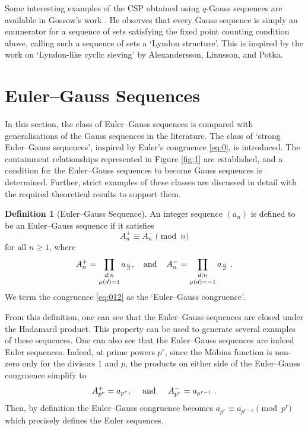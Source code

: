 \documentclass{article}
\numberwithin{equation}{section}
\theoremstyle{definition}
\newtheorem{definition}{\bf {Definition}}[section]
\begin{document}
Some interesting examples of the CSP obtained using $q$-Gauss sequences are available in Gossow's work \cite{fern_gauss}. He observes that every Gauss sequence is simply an enumerator for a sequence of sets satisfying the fixed point counting condition above, calling such a sequence of sets a `Lyndon structure'. This is inspired by the work \cite{csp-lyndon} on `Lyndon-like cyclic sieving' by Alexandersson, Linusson, and Potka.
 
\section{Euler--Gauss Sequences}\label{sec:2} 
In this section, the class of Euler--Gauss sequences is compared with generalisations of the Gauss sequences in the literature. The class of `strong Euler--Gauss sequences', inspired by Euler's congruence \eqref{eq:0}, is introduced. The containment relationships represented in Figure \ref{fig:1} are established, and a condition for the Euler--Gauss sequences to become Gauss sequences is determined. Further, strict examples of these classes are discussed in detail with the required theoretical results to support them.  

\begin{definition}[Euler--Gauss Sequence]
    An integer sequence $(a_n)$ is defined to be an Euler--Gauss sequence if it satisfies 
    \begin{equation}\label{eq:012}
        A_n^+\equiv A_n^-\pmod{n}
    \end{equation}
    for all $n\geq1$, where 
    \[A_n^+=\prod_{\substack{d\mid n \\ \mu(d)=1}} a_{\frac{n}{d}}\text{,\hspace{4mm}and\hspace{4mm}}A_n^-=\prod_{\substack{d\mid n \\ \mu(d)=-1}} a_{\frac{n}{d}}\text{ .}\] We term the congruence \eqref{eq:012} as the `Euler--Gauss congruence'.
\end{definition}

From this definition, one can see that the Euler--Gauss sequences are closed under the Hadamard product. This property can be used to generate several examples of these sequences. One can also see that the Euler--Gauss sequences are indeed Euler sequences.
Indeed, at prime powers $p^r$, since the M\"{o}bius function is non-zero only for the divisors $1$ and $p$, the products on either side of the Euler--Gauss congruence simplify to
\[A_{p^r}^+=a_{p^r}\text{, \hspace{4mm}and \hspace{4mm}}A_{p^r}^-=a_{p^{r-1}}\text{ .}\]
Then, by definition the Euler--Gauss congruence becomes $a_{p^r}\equiv a_{p^{r-1}}\pmod{p^r}$ which precisely defines the Euler sequences. 
 
\end{document}
